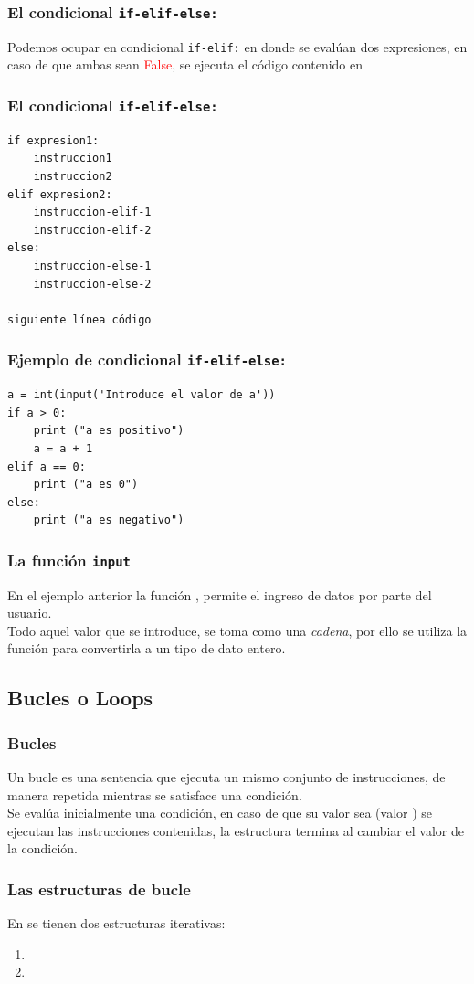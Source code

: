 \documentclass[12pt]{beamer}
\begin{document}
\begin{frame}[fragile]
\frametitle{El condicional \texttt{if-elif-else:}}
Podemos ocupar en condicional \texttt{if-elif:} en donde se evalúan dos expresiones, en caso de que ambas sean \textcolor{red}{False}, se ejecuta el código contenido en 
\end{frame}
\begin{frame}[fragile]
\frametitle{El condicional \texttt{if-elif-else:}}
\fontsize{12}{12}\selectfont
\begin{verbatim}
if expresion1:
    instruccion1
    instruccion2
elif expresion2:
    instruccion-elif-1
    instruccion-elif-2
else:
    instruccion-else-1
    instruccion-else-2

siguiente línea código
\end{verbatim}
\end{frame}
\begin{frame}[fragile]
\frametitle{Ejemplo de condicional \texttt{if-elif-else:}}
\begin{lstlisting}[caption=Ejemplo de un condicionla if-elif-else]
a = int(input('Introduce el valor de a'))
if a > 0:
    print ("a es positivo")
    a = a + 1
elif a == 0: 
    print ("a es 0")
else:
    print ("a es negativo")
\end{lstlisting}
\end{frame}
\begin{frame}
\frametitle{La función \texttt{input}}
En el ejemplo anterior la función , permite el ingreso de datos por parte del usuario.
\\
\bigskip
\pause
Todo aquel valor que se introduce, se toma como una \emph{cadena}, por ello se utiliza la función  para convertirla a un tipo de dato entero.
\end{frame}

\subsection{Bucles o Loops}

\begin{frame}
\frametitle{Bucles}
Un bucle es una sentencia que ejecuta un mismo conjunto de instrucciones, de manera repetida mientras se satisface una condición.
\\
\bigskip
Se evalúa inicialmente una condición, en caso de que su valor sea (valor ) se ejecutan las instrucciones contenidas, \pause la estructura termina al cambiar el valor de la condición.
\end{frame}
\begin{frame}
\frametitle{Las estructuras de bucle}
En \python{} se tienen dos estructuras iterativas:
\begin{enumerate}[<+->]
\item {}
\item {}
\end{enumerate}
\end{frame}
\end{document}
